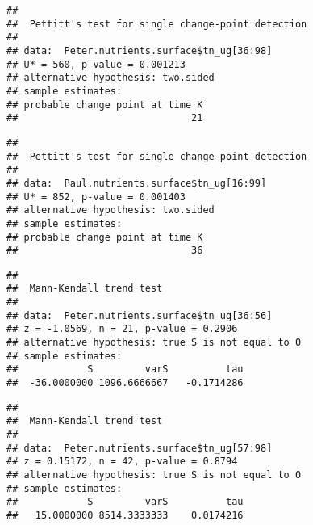 \documentclass[]{article}
\newenvironment{Shaded}{\begin{snugshade}}{\end{snugshade}}
\newcommand{\KeywordTok}[1]{\textcolor[rgb]{0.13,0.29,0.53}{\textbf{#1}}}
\newcommand{\DecValTok}[1]{\textcolor[rgb]{0.00,0.00,0.81}{#1}}
\newcommand{\CommentTok}[1]{\textcolor[rgb]{0.56,0.35,0.01}{\textit{#1}}}
\newcommand{\OperatorTok}[1]{\textcolor[rgb]{0.81,0.36,0.00}{\textbf{#1}}}
\newcommand{\NormalTok}[1]{#1}
\begin{document}
\begin{verbatim}
## 
##  Pettitt's test for single change-point detection
## 
## data:  Peter.nutrients.surface$tn_ug[36:98]
## U* = 560, p-value = 0.001213
## alternative hypothesis: two.sided
## sample estimates:
## probable change point at time K 
##                              21
\end{verbatim}

\begin{Shaded}
\end{Shaded}

\begin{verbatim}
## 
##  Pettitt's test for single change-point detection
## 
## data:  Paul.nutrients.surface$tn_ug[16:99]
## U* = 852, p-value = 0.001403
## alternative hypothesis: two.sided
## sample estimates:
## probable change point at time K 
##                              36
\end{verbatim}

\begin{Shaded}
\end{Shaded}

\begin{verbatim}
## 
##  Mann-Kendall trend test
## 
## data:  Peter.nutrients.surface$tn_ug[36:56]
## z = -1.0569, n = 21, p-value = 0.2906
## alternative hypothesis: true S is not equal to 0
## sample estimates:
##            S         varS          tau 
##  -36.0000000 1096.6666667   -0.1714286
\end{verbatim}

\begin{Shaded}
\end{Shaded}

\begin{verbatim}
## 
##  Mann-Kendall trend test
## 
## data:  Peter.nutrients.surface$tn_ug[57:98]
## z = 0.15172, n = 42, p-value = 0.8794
## alternative hypothesis: true S is not equal to 0
## sample estimates:
##            S         varS          tau 
##   15.0000000 8514.3333333    0.0174216
\end{verbatim}
\end{document}
